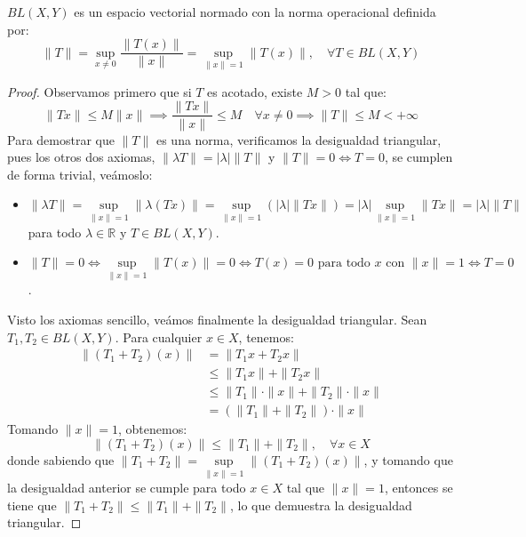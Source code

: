 \begin{prop}\label{prop:norma-operacional}
    $BL(X, Y)$ es un espacio vectorial normado con la norma operacional definida por:
    \begin{equation*}
        \|T\| = \sup_{x \neq 0} \frac{\|T(x)\|}{\|x\|} = \sup_{\|x\|=1} \|T(x)\|, \quad \forall T \in BL(X, Y)
    \end{equation*}

\begin{proof}
    Observamos primero que si $T$ es acotado, existe $M > 0$ tal que:
    \begin{equation*}
        \|Tx\| \leq M\|x\| \implies \frac{\|Tx\|}{\|x\|} \leq M \quad \forall x \neq 0 \implies \|T\| \leq M < +\infty
    \end{equation*}
    Para demostrar que $\|T\|$ es una norma, verificamos la desigualdad triangular, pues los otros dos axiomas, $\|\lambda T\| = |\lambda|\|T\|$ y $\|T\|=0 \iff T=0$, se cumplen de forma trivial, veámoslo:

    \begin{itemize}
        \item $\|\lambda T\| = \sup\limits_{\|x\|=1} \|\lambda (Tx)\|=\sup\limits_{\|x\|=1} \left(|\lambda| \|Tx\|\right)= |\lambda| \sup\limits_{\|x\|=1} \|Tx\| = |\lambda|\|T\|$ para todo $\lambda \in \mathbb{R}$ y $T \in BL(X, Y)$.
        \item $\|T\|=0 \iff \sup\limits_{\|x\|=1} \|T(x)\|=0 \iff T(x)=0 \text{ para todo } x \text{ con } \|x\|=1 \iff T=0$.
    \end{itemize}

    \noindent
    Visto los axiomas sencillo, veámos finalmente la desigualdad triangular. Sean $T_1, T_2 \in BL(X, Y)$. Para cualquier $x \in X$, tenemos:
    \begin{align*}
        \|(T_1 + T_2)(x)\| &= \|T_1x + T_2x\| \\
        &\leq \|T_1x\| + \|T_2x\| \\
        &\leq \|T_1\| \cdot \|x\| + \|T_2\| \cdot \|x\| \\
        &= (\|T_1\| + \|T_2\|) \cdot \|x\|
    \end{align*}
    Tomando $\|x\|=1$, obtenemos:
    \begin{equation*}
        \|(T_1 + T_2)(x)\| \leq \|T_1\| + \|T_2\|, \quad \forall x\in X
    \end{equation*}
    donde sabiendo que $\| T_1 + T_2\| = \sup\limits_{\|x\|=1} \|(T_1 + T_2)(x)\|$, y tomando que la desigualdad anterior se cumple para todo $x\in X$ tal que $\|x\|=1$, entonces se tiene que $\|T_1 + T_2\| \leq \|T_1\| + \|T_2\|$, lo que demuestra la desigualdad triangular.
\end{proof}
\end{prop}

